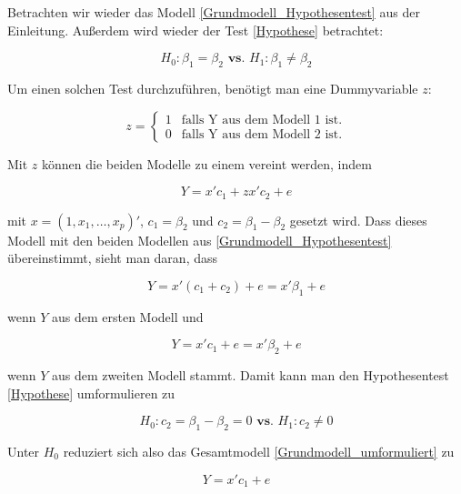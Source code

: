 \documentclass[12pt,a4paper]{article}
\theoremstyle{definition}
\theoremstyle{definition}
\theoremstyle{definition}
\theoremstyle{definition}
\begin{document}
Betrachten wir wieder das Modell \ref{Grundmodell_Hypothesentest} aus der Einleitung. Außerdem wird wieder der Test \eqref{Hypothese} betrachtet:

\begin{equation*}
H_{0} : \beta_{1} = \beta_{2}  \textbf{ vs. }  H_{1} : \beta_{1} \neq \beta_{2}
\end{equation*}

Um einen solchen Test durchzuführen, benötigt man eine Dummyvariable $z$:

\begin{equation*}
z=\begin{cases}
1 & \text{falls Y aus dem Modell 1 ist.}\\
0 & \text{falls Y aus dem Modell 2 ist.} 
\end{cases}
\end{equation*}

Mit $z$ können die beiden Modelle zu einem vereint werden, indem

\begin{equation}
Y = x' c_1 + z x' c_2 + e \label{Grundmodell_umformuliert}
\end{equation}

mit $x=(1,x_1,\ldots,x_p)'$, $c_1=\beta_2$ und $c_2=\beta_1-\beta_2$ gesetzt wird. Dass dieses Modell mit den beiden Modellen aus \eqref{Grundmodell_Hypothesentest} übereinstimmt, sieht man daran, dass

\begin{equation*}
Y = x'(c_1+c_2)+e = x'\beta_1+e
\end{equation*}

wenn $Y$ aus dem ersten Modell und 

\begin{equation*}
Y = x'c_1+e = x'\beta_2+e
\end{equation*}

wenn $Y$ aus dem zweiten Modell stammt. Damit kann man den Hypothesentest \eqref{Hypothese} umformulieren zu

\begin{equation*}
H_{0} : c_2 = \beta_1-\beta_2 = 0  \textbf{ vs. }  H_{1} : c_2 \neq 0 
\end{equation*}

Unter $H_{0}$ reduziert sich also das Gesamtmodell \eqref{Grundmodell_umformuliert} zu 

\begin{equation*}
Y = x' c_1 + e
\end{equation*}
\end{document}
